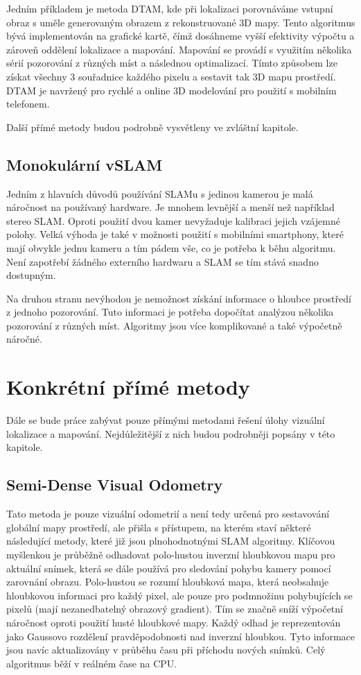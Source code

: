 \documentclass[12pt,a4paper]{article}
\begin{document}
Jedním příkladem je metoda DTAM, kde při lokalizaci porovnáváme vstupní obraz s uměle generovaným obrazem z rekonstruované 3D mapy. Tento algoritmus bývá implementován na grafické kartě, čímž dosáhneme vyšší efektivity výpočtu a zároveň oddělení lokalizace a mapování. Mapování se provádí s využitím několika sérií pozorování z různých míst a následnou optimalizací. Tímto způsobem lze získat všechny 3 souřadnice každého pixelu a sestavit tak 3D mapu prostředí. DTAM je navržený pro rychlé a online 3D modelování pro použití s mobilním telefonem.

Další přímé metody budou podrobně vysvětleny ve zvláštní kapitole.

\subsection{Monokulární vSLAM}
Jedním z hlavních důvodů používání SLAMu s jedinou kamerou je malá náročnost na používaný hardware. Je mnohem levnější a menší než například stereo SLAM. Oproti použití dvou kamer nevyžaduje kalibraci jejich vzájemné polohy. Velká výhoda je také v možnosti použití s mobilními smartphony, které mají obvykle jednu kameru a tím pádem vše, co je potřeba k běhu algoritmu. Není zapotřebí žádného externího hardwaru a SLAM se tím stává snadno dostupným.

Na druhou stranu nevýhodou je nemožnost získání informace o hloubce prostředí z jednoho pozorování. Tuto informaci je potřeba dopočítat analýzou několika pozorování z různých míst. Algoritmy jsou více komplikované a také výpočetně náročné.

\section{Konkrétní přímé metody}
Dále se bude práce zabývat pouze přímými metodami řešení úlohy vizuální lokalizace a mapování. Nejdůležitější z nich budou podrobněji popsány v této kapitole.

\subsection{Semi-Dense Visual Odometry}
Tato metoda je pouze vizuální odometrií a není tedy určená pro sestavování globální mapy prostředí, ale přišla s přístupem, na kterém staví některé následující metody, které již jsou plnohodnotnými SLAM algoritmy. Klíčovou myšlenkou je průběžně odhadovat polo-hustou inverzní hloubkovou mapu pro aktuální snímek, která se dále používá pro sledování pohybu kamery pomocí zarovnání obrazu. Polo-hustou se rozumí hloubková mapa, která neobsahuje hloubkovou informaci pro každý pixel, ale pouze pro podmnožinu pohybujících se pixelů (mají nezanedbatelný obrazový gradient). Tím se značně sníží výpočetní náročnost oproti použití husté hloubkové mapy. Každý odhad je reprezentován jako Gaussovo rozdělení pravděpodobnosti nad inverzní hloubkou. Tyto informace jsou navíc aktualizovány v průběhu času při příchodu nových snímků. Celý algoritmus běží v reálném čase na CPU.
\end{document}
